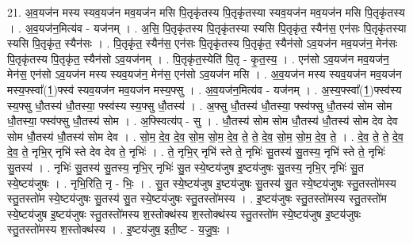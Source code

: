\documentclass[17pt]{extarticle}
\begin{document}
21. अ॒व॒यज॑न मस्य स्यव॒यज॑न मव॒यज॑न मसि पि॒तृकृ॑तस्य पि॒तृकृ॑तस्या स्यव॒यज॑न मव॒यज॑न मसि पि॒तृकृ॑तस्य । . अ॒व॒यज॑न॒मित्य॑व - यज॑नम् । . अ॒सि॒ पि॒तृकृ॑तस्य पि॒तृकृ॑तस्या स्यसि पि॒तृकृ॑त॒ स्यैन॑स॒ एन॑सः पि॒तृकृ॑तस्या स्यसि पि॒तृकृ॑त॒ स्यैन॑सः । . पि॒तृकृ॑त॒ स्यैन॑स॒ एन॑सः पि॒तृकृ॑तस्य पि॒तृकृ॑त॒ स्यैन॑सो ऽव॒यज॑न मव॒यज॑न॒ मेन॑सः पि॒तृकृ॑तस्य पि॒तृकृ॑त॒ स्यैन॑सो ऽव॒यज॑नम् । . पि॒तृकृ॑त॒स्येति॑ पि॒तृ - कृ॒त॒स्य॒ । . एन॑सो ऽव॒यज॑न मव॒यज॑न॒ मेन॑स॒ एन॑सो ऽव॒यज॑न मस्य स्यव॒यज॑न॒ मेन॑स॒ एन॑सो ऽव॒यज॑न मसि । . अ॒व॒यज॑न मस्य स्यव॒यज॑न मव॒यज॑न मस्य॒फ्स्वा᳚(1॒)फ्स्व॑ स्यव॒यज॑न मव॒यज॑न मस्य॒फ्सु । . अ॒व॒यज॑न॒मित्य॑व - यज॑नम् । . अ॒स्य॒फ्स्वा᳚(1॒)फ्स्व॑स्य स्य॒फ्सु धौ॒तस्य॑ धौ॒तस्या॒ फ्स्व॑स्य स्य॒फ्सु धौ॒तस्य॑ । . अ॒फ्सु धौ॒तस्य॑ धौ॒तस्या॒ फ्स्व॑फ्सु धौ॒तस्य॑ सोम सोम धौ॒तस्या॒ फ्स्व॑फ्सु धौ॒तस्य॑ सोम । . अ॒फ्स्वित्य॑प् - सु । . धौ॒तस्य॑ सोम सोम धौ॒तस्य॑ धौ॒तस्य॑ सोम देव देव सोम धौ॒तस्य॑ धौ॒तस्य॑ सोम देव । . सो॒म॒ दे॒व॒ दे॒व॒ सो॒म॒ सो॒म॒ दे॒व॒ ते॒ ते॒ दे॒व॒ सो॒म॒ सो॒म॒ दे॒व॒ ते॒ । . दे॒व॒ ते॒ ते॒ दे॒व॒ दे॒व॒ ते॒ नृभि॒र् नृभि॑ स्ते देव देव ते॒ नृभिः॑ । . ते॒ नृभि॒र् नृभि॑ स्ते ते॒ नृभिः॑ सु॒तस्य॑ सु॒तस्य॒ नृभि॑ स्ते ते॒ नृभिः॑ सु॒तस्य॑ । . नृभिः॑ सु॒तस्य॑ सु॒तस्य॒ नृभि॒र् नृभिः॑ सु॒त स्ये॒ष्टय॑जुष इ॒ष्टय॑जुषः सु॒तस्य॒ नृभि॒र् नृभिः॑ सु॒त स्ये॒ष्टय॑जुषः । . नृभि॒रिति॒ नृ - भिः॒ । . सु॒त स्ये॒ष्टय॑जुष इ॒ष्टय॑जुषः सु॒तस्य॑ सु॒त स्ये॒ष्टय॑जुषः स्तु॒तस्तो॑मस्य 
स्तु॒तस्तो॑म स्ये॒ष्टय॑जुषः सु॒तस्य॑ सु॒त स्ये॒ष्टय॑जुषः स्तु॒तस्तो॑मस्य । . इ॒ष्टय॑जुषः स्तु॒तस्तो॑मस्य स्तु॒तस्तो॑म स्ये॒ष्टय॑जुष इ॒ष्टय॑जुषः स्तु॒तस्तो॑मस्य श॒स्तोक्थ॑स्य श॒स्तोक्थ॑स्य स्तु॒तस्तो॑म स्ये॒ष्टय॑जुष इ॒ष्टय॑जुषः स्तु॒तस्तो॑मस्य श॒स्तोक्थ॑स्य । . इ॒ष्टय॑जुष॒ इती॒ष्ट - य॒जु॒षः॒ । \newline
\end{document}
